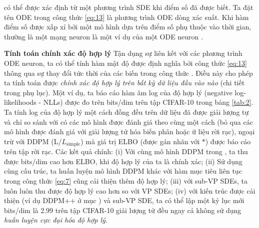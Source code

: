 \documentclass{article} %
\begin{document}
có thể được xác định từ một phương trình SDE khi điểm số đã được biết.
Ta đặt tên ODE trong công thức \ref{eq:13} là phương trình ODE dòng xác suất.
Khi hàm điểm số được xấp xỉ bởi một mô hình dựa trên điểm số phụ thuộc vào thời gian, thường là một mạng neuron là một ví dụ của một ODE neuron \citep{chen2018neural}.

\textbf{Tính toán chính xác độ hợp lý} Tận dụng sự liên kết với các phương trình ODE neuron, ta có thể tính hàm mật độ được định nghĩa bởi công thức \ref{eq:13} thông qua sự thay đổi tức thời của các biến trong công thức \citep{chen2018neural}.
Điều này cho phép ta tính toán được \textit{chính xác độ hợp lý trên bất kỳ dữ liệu đầu vào nào} (chi tiết trong phụ lục).
Một ví dụ, ta báo cáo hàm âm log của độ hợp lý (negative log-likelihoods - NLLs) được đo trên bits/dim trên tập CIFAR-10 trong bảng \ref{tab:2}.
Ta tính log của độ hợp lý một cách đồng đều trên dữ liệu đã được giải lượng tự và chỉ so sánh với có các mô hình được đánh giá theo cùng một cách (bỏ qua các mô hình được đánh giá với giải lượng tử hóa biến phân \citep{ho2019flow++} hoặc ữ liệu rời rạc), ngoại trừ với DDPM (L/$L_{\mathrm{simple}}$) mà giá trị ELBO (được gán nhãn với $\ast$) được báo cáo trên tập rời rạc.
Các kết quả chính: (i) Với cùng mô hình DDPM trong \citep{ho2020denoising}, ta thu được bits/dim cao hơn ELBO, khi độ hợp lý của ta là chính xác;
(ii) Sử dụng cùng cấu trúc, ta huấn luyện mô hình DDPM khác với hàm mục tiêu liên tục trong công thức \ref{eq:7} cũng cải thiện thêm độ hợp lý;
(iii) với sub-VP SDEs, ta luôn luôn thu được độ hợp lý cao hơn so với VP SDEs;
(iv) với kiến trúc được cải thiện (ví dụ DDPM++ ở mục ) và sub-VP SDE, ta có thể lập một kỷ lục mới bits/dim là 2.99 trên tập CIFAR-10 giải lượng tử đều ngay cả không sử dụng \textit{huấn luyện cực đại hóa độ hợp lý}.
\end{document}
